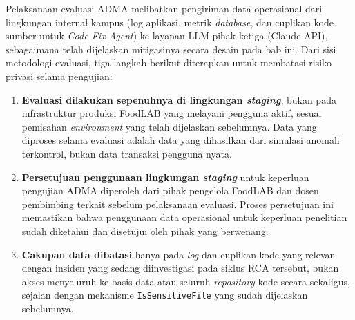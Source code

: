 Pelaksanaan evaluasi ADMA melibatkan pengiriman data operasional dari lingkungan internal kampus (log aplikasi, metrik \textit{database}, dan cuplikan kode sumber untuk \textit{Code Fix Agent}) ke layanan LLM pihak ketiga (Claude API), sebagaimana telah dijelaskan mitigasinya secara desain pada bab ini. Dari sisi metodologi evaluasi, tiga langkah berikut diterapkan untuk membatasi risiko privasi selama pengujian:

\begin{enumerate}[label=\arabic*., leftmargin=*]
  \item \textbf{Evaluasi dilakukan sepenuhnya di lingkungan \textit{staging}}, bukan pada infrastruktur produksi FoodLAB yang melayani pengguna aktif, sesuai pemisahan \textit{environment} yang telah dijelaskan sebelumnya. Data yang diproses selama evaluasi adalah data yang dihasilkan dari simulasi anomali terkontrol, bukan data transaksi pengguna nyata.
  \item \textbf{Persetujuan penggunaan lingkungan \textit{staging}} untuk keperluan pengujian ADMA diperoleh dari pihak pengelola FoodLAB dan dosen pembimbing terkait sebelum pelaksanaan evaluasi. Proses persetujuan ini memastikan bahwa penggunaan data operasional untuk keperluan penelitian sudah diketahui dan disetujui oleh pihak yang berwenang.
  \item \textbf{Cakupan data dibatasi} hanya pada \textit{log} dan cuplikan kode yang relevan dengan insiden yang sedang diinvestigasi pada siklus RCA tersebut, bukan akses menyeluruh ke basis data atau seluruh \textit{repository} kode secara sekaligus, sejalan dengan mekanisme \texttt{IsSensitiveFile} yang sudah dijelaskan sebelumnya.
\end{enumerate}